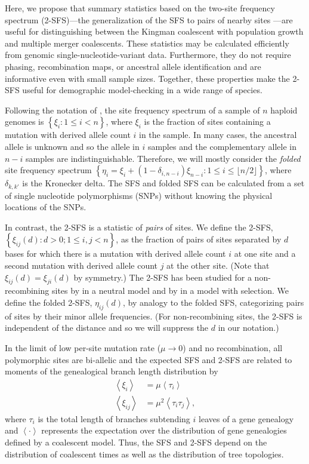 \documentclass[11pt, letterpaper]{article}   	%
\newcommand{\floor}[1]{\lfloor #1 \rfloor}
\newcommand{\E}[1]{\left< #1 \right>}
\begin{document}
Here, we propose that summary statistics based on the two-site frequency spectrum (2-SFS)---the generalization of the SFS to pairs of nearby sites \autocite{Hudson2001, FerrettiEtAl2018}---are useful for distinguishing between the Kingman coalescent with population growth and multiple merger coalescents.
These statistics may be calculated efficiently from genomic single-nucleotide-variant data.
Furthermore, they do not require phasing, recombination maps, or ancestral allele identification and are informative even with small sample sizes.
Together, these properties make the 2-SFS useful for demographic model-checking in a wide range of species.

Following the notation of \textcite{Fu1995}, the site frequency spectrum of a sample of $n$ haploid genomes is $\left\{ \xi_i : 1 \leq i < n \right\}$, where $\xi_i$ is the fraction of sites containing a mutation with derived allele count $i$ in the sample.
In many cases, the ancestral allele is unknown and so the allele in $i$ samples and the complementary allele in $n-i$ samples are indistinguishable.
Therefore, we will mostly consider the \textit{folded} site frequency spectrum $\left\{ \eta_i = \xi_i + (1-\delta_{i,n-i}) \xi_{n-i}: 1 \leq i \leq \floor{n/2} \right\}$, where $\delta_{k,k'}$ is the Kronecker delta. %
The SFS and folded SFS can be calculated from a set of single nucleotide polymorphisms (SNPs) without knowing the physical locations of the SNPs.

In contrast, the 2-SFS is a statistic of \textit{pairs} of sites.
We define the 2-SFS,
$\left\{ \xi_{ij}(d) : d > 0; 1 \leq i, j < n\right\}$,
as the fraction of pairs of sites separated by $d$ bases for which there is a mutation with derived allele count $i$ at one site and a second mutation with derived allele count $j$ at the other site.
(Note that $\xi_{ij}(d) = \xi_{ji}(d)$ by symmetry.)
The 2-SFS has been studied for a non-recombining sites by \textcite{FerrettiEtAl2018} in a neutral model and by \textcite{Xie2011a} in a model with selection.
We define the folded 2-SFS, $\eta_{ij}(d)$, by analogy to the folded SFS,  categorizing pairs of sites by their minor allele frequencies. (For non-recombining sites, the 2-SFS is independent of the distance and so we will suppress the $d$ in our notation.)

In the limit of low per-site mutation rate ($\mu\to0$) and no recombination, all polymorphic sites are bi-allelic and the expected SFS and 2-SFS are related to moments of the genealogical branch length distribution by
\begin{align}
    \E{\xi_i} &= \mu \E{\tau_i} \label{eq:expected_sfs} \\
    \E{\xi_{ij}} &= \mu^2 \E{\tau_i \tau_j},
    \label{eq:expected_2sfs}
\end{align}
where $\tau_i$ is the total length of branches subtending $i$ leaves of a gene genealogy and $\E{\cdot}$ represents the expectation over the distribution of gene genealogies defined by a coalescent model.
Thus, the SFS and 2-SFS depend on the distribution of coalescent times as well as the distribution of tree topologies.
\end{document}
